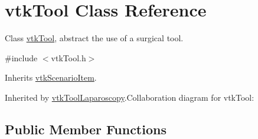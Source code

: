 \hypertarget{classvtkTool}{
\section{vtkTool Class Reference}
\label{classvtkTool}
}


Class \hyperlink{classvtkTool}{vtkTool}, abstract the use of a surgical tool.  


{\ttfamily \#include $<$vtkTool.h$>$}

Inherits \hyperlink{classvtkScenarioItem}{vtkScenarioItem}.

Inherited by \hyperlink{classvtkToolLaparoscopy}{vtkToolLaparoscopy}.Collaboration diagram for vtkTool:\subsection*{Public Member Functions}

